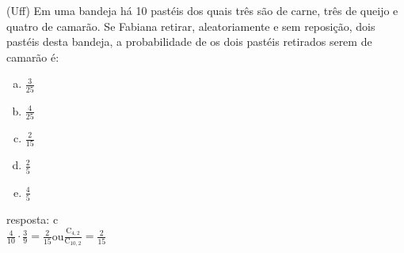 \begin{ex}
 (Uff) Em uma bandeja há 10 pastéis dos quais três são de carne, três de queijo e quatro de camarão. Se Fabiana retirar, aleatoriamente e sem reposição, dois pastéis desta bandeja, a probabilidade de os dois pastéis retirados serem de camarão é: 
    \begin{enumerate}[(a)]
    \item $\frac{3}{25}$
    \item $\frac{4}{25}$
    \item $\frac{2}{15}$
    \item $\frac{2}{5}$
    \item $\frac{4}{5}$
    \end{enumerate}
      \begin{sol}
       resposta: c \\
       $\frac{4}{10}\cdot\frac{3}{9}=\frac{2}{15}$\hspace{0,4cm}ou\hspace{0,4cm}$\frac{\mathrm{C}_{4,2}}{\mathrm{C}_{{10},2}}=\frac{2}{15}$
      \end{sol}
\end{ex}
